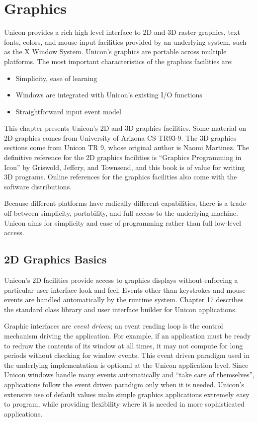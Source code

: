 \chapter{Graphics}

Unicon provides a rich high level interface to 2D and 3D raster
graphics, text fonts, colors, and mouse input facilities provided by
an underlying system, such as the X Window System.  Unicon's graphics
are portable across multiple platforms. The most important
characteristics of the graphics facilities are:
\begin{itemize}\itemsep0pt \item Simplicity, ease of learning \item
Windows are integrated with Unicon's existing I/O functions \item
Straightforward input event model \end{itemize} This chapter presents
Unicon's 2D and 3D graphics facilities.  Some material on 2D graphics
comes from University of Arizona CS TR93-9. The 3D graphics sections
come from Unicon TR 9, whose original author is Naomi Martinez. The
definitive reference for the 2D graphics facilities is ``Graphics
Programming in Icon'' by Griswold, Jeffery, and Townsend, and this
book is of value for writing 3D programs. Online references for the
graphics facilities also come with the software distributions.

Because different platforms have radically different capabilities,
there is a trade-off between simplicity, portability, and full access
to the underlying machine. Unicon aims for simplicity and ease of
programming rather than full low-level access.

\section{2D Graphics Basics}

Unicon's 2D facilities provide access to graphics displays without
enforcing a particular user interface look-and-feel.  Events other
than keystrokes and mouse events are handled automatically by the
runtime system. Chapter 17 describes the standard class library and
user interface builder for Unicon applications.

Graphic interfaces are \emph{event driven}; an
event reading loop is the control mechanism driving the application.
For example, if an application must be ready to redraw the contents of
its window at all times, it may not compute for long periods without
checking for window events. This event driven paradigm used in the
underlying implementation is optional at the Unicon application
level. Since Unicon windows handle many events automatically and
``take care of themselves'', applications follow the event driven
paradigm only when it is needed.  Unicon's extensive use of default
values make simple graphics applications extremely easy to program,
while providing flexibility where it is needed in more sophisticated
applications.


